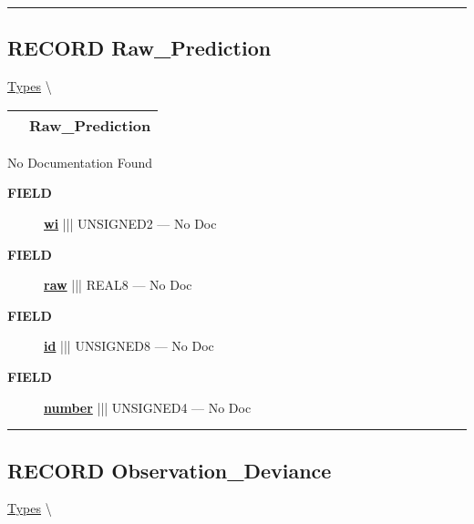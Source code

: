 \rule{\linewidth}{0.5pt}
\subsection*{\textsf{\colorbox{headtoc}{\color{white} RECORD}
Raw\_Prediction}}

\hypertarget{ecldoc:logisticregression.types.raw_prediction}{}
\hspace{0pt} \hyperlink{ecldoc:LogisticRegression.Types}{Types} \textbackslash 

{\renewcommand{\arraystretch}{1.5}
\begin{tabularx}{\textwidth}{|>{\raggedright\arraybackslash}l|X|}
\hline
\hspace{0pt}\mytexttt{\color{red} } & \textbf{Raw\_Prediction} \\
\hline
\end{tabularx}
}

\par





No Documentation Found







\par
\begin{description}
\item [\colorbox{tagtype}{\color{white} \textbf{\textsf{FIELD}}}] \textbf{\underline{wi}} ||| UNSIGNED2 --- No Doc
\item [\colorbox{tagtype}{\color{white} \textbf{\textsf{FIELD}}}] \textbf{\underline{raw}} ||| REAL8 --- No Doc
\item [\colorbox{tagtype}{\color{white} \textbf{\textsf{FIELD}}}] \textbf{\underline{id}} ||| UNSIGNED8 --- No Doc
\item [\colorbox{tagtype}{\color{white} \textbf{\textsf{FIELD}}}] \textbf{\underline{number}} ||| UNSIGNED4 --- No Doc
\end{description}





\rule{\linewidth}{0.5pt}
\subsection*{\textsf{\colorbox{headtoc}{\color{white} RECORD}
Observation\_Deviance}}

\hypertarget{ecldoc:logisticregression.types.observation_deviance}{}
\hspace{0pt} \hyperlink{ecldoc:LogisticRegression.Types}{Types} \textbackslash 

